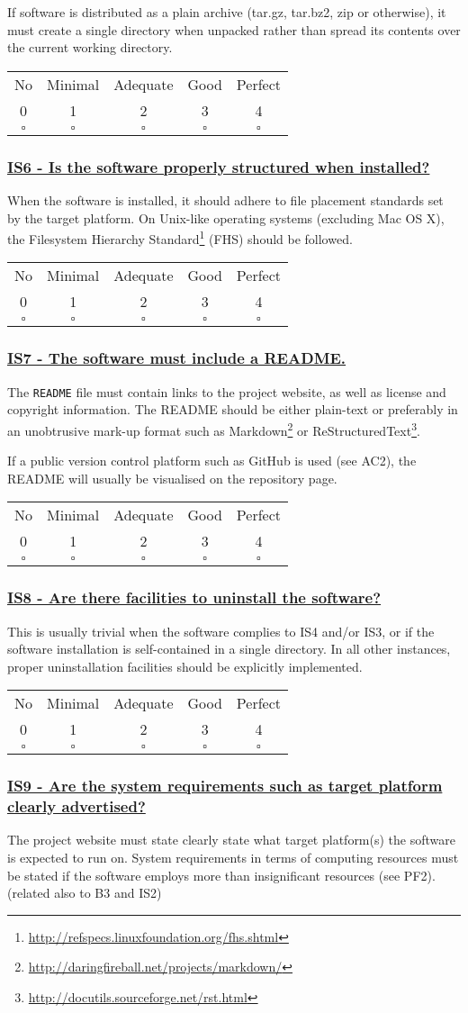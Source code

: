 \documentclass[a4paper,11pt]{article}
\newcommand{\criterion}[2]{\subsubsection*{\underline{#1 - #2}}\label{id:#1}}
\newcommand\CheckTable{%
  \begin{tabular}{ccccc}
    No & Minimal & Adequate & Good & Perfect \\
    0 & 1 & 2 & 3 & 4 \\
    \hline
    $\square$ & $\square$ & $\square$ & $\square$ & $\square$ \\
  \end{tabular}%
}
\begin{document}
If software is distributed as a plain archive (tar.gz, tar.bz2, zip or otherwise),
it must create a single directory when unpacked rather than spread its contents
over the current working directory.

\CheckTable

\newcommand{\isSixID}{IS6}
\newcommand{\isSixText}{Is the software properly structured when installed?}
\criterion{\isSixID}{\isSixText}

When the software is installed, it should adhere to file placement standards set
by the target platform. On Unix-like operating systems (excluding Mac OS X), the Filesystem
Hierarchy Standard\footnote{\url{http://refspecs.linuxfoundation.org/fhs.shtml}} (FHS) should be followed.

\CheckTable

\newcommand{\isSevenID}{IS7}
\newcommand{\isSevenText}{The software must include a README.}
\criterion{\isSevenID}{\isSevenText}

The \texttt{README} file must contain links to the project website, as well as
license and copyright information. The README should be either plain-text or
preferably in an unobtrusive mark-up format such as
Markdown\footnote{\url{http://daringfireball.net/projects/markdown/}} or
ReStructuredText\footnote{\url{http://docutils.sourceforge.net/rst.html}}.

If a public version control platform such as GitHub is used (see AC2), the
README will usually be visualised on the repository page.

\CheckTable

\newcommand{\isEightID}{IS8}
\newcommand{\isEightText}{Are there facilities to uninstall the software?}
\criterion{\isEightID}{\isEightText}

This is usually trivial when the software complies to IS4 and/or IS3, or if the
software installation is self-contained in a single directory. In all other
instances, proper uninstallation facilities should be explicitly implemented.

\CheckTable

\newcommand{\isNineID}{IS9}
\newcommand{\isNineText}{Are the system requirements such as target platform clearly advertised?}
\criterion{\isNineID}{\isNineText}

The project website must state clearly state what target platform(s) the software is expected to run on.
System requirements in terms of computing resources must be stated if the software employs more than insignificant resources (see PF2).
(related also to B3 and IS2)
\end{document}
